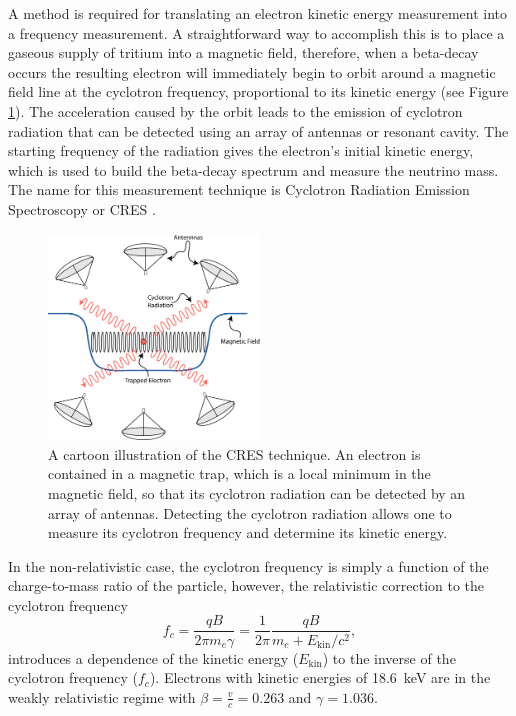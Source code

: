 A method is required for translating an electron kinetic energy measurement into a frequency measurement. A straightforward way to accomplish this is to place a gaseous supply of tritium into a magnetic field, therefore, when a beta-decay occurs the resulting electron will immediately begin to orbit around a magnetic field line at the cyclotron frequency, proportional to its kinetic energy (see Figure \ref{fig:chap3-cres-cartoon}). The acceleration caused by the orbit leads to the emission of cyclotron radiation that can be detected using an array of antennas or resonant cavity. The starting frequency of the radiation gives the electron's initial kinetic energy, which is used to build the beta-decay spectrum and measure the neutrino mass. The name for this measurement technique is Cyclotron Radiation Emission Spectroscopy or CRES \cite{p8originalcres}.

\begin{figure}[htbp]
    \centering
    \includegraphics[width=0.5\textwidth]{figs/Chapter-3/230303_cres_cartoon.png}
    \caption{A cartoon illustration of the CRES technique. An electron is contained in a magnetic trap, which is a local minimum in the magnetic field, so that its cyclotron radiation can be detected by an array of antennas. Detecting the cyclotron radiation allows one to measure its cyclotron frequency and determine its kinetic energy.}
    \label{fig:chap3-cres-cartoon}
\end{figure}

In the non-relativistic case, the cyclotron frequency is simply a function of the charge-to-mass ratio of the particle, however, the relativistic correction to the cyclotron frequency
\begin{equation}
    f_c = \frac{qB}{2\pi m_e\gamma}=\frac{1}{2\pi}\frac{qB}{m_e+E_\mathrm{kin}/c^2},
    \label{eq:chap3-cyclotron-freq}
\end{equation} 
introduces a dependence of the kinetic energy ($E_\mathrm{kin}$) to the inverse of the cyclotron frequency ($f_c$). Electrons with kinetic energies of 18.6~keV are in the weakly relativistic regime with $\beta=\frac{v}{c}=0.263$ and $\gamma=1.036$.


